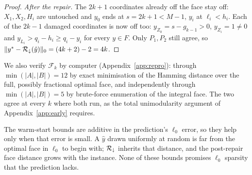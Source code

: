 \begin{proof}
\emph{After the repair.} The $2k+1$ coordinates already off the face stay off:
$X_1, X_2, H_i$ are untouched and $y_0$ ends at $s = 2k+1 < M-1$, $y_i$ at $\ell_i < h_i$. Each of
the $2k-1$ damaged coordinates is now off too: $y_{Z_0} = s - g_{k-1} > 0$, $y_{Z_i} = 1 \ne 0$ and
$y_{L_i} > q_i - h_i \ge q_i - y_i$ for every $y \in F$. Only $P_1, P_2$ still agree, so
$\|y^* - \mathcal{R}_\downarrow(\hat y)\|_0 = (4k+2) - 2 = 4k$.
\end{proof}

We also verify $\mathcal{F}_k$ by computer (Appendix~\ref{app:repro}): through
$\min(|A|,|B|) = 12$ by exact minimisation of the Hamming distance over the full, possibly
fractional optimal face, and independently through $\min(|A|,|B|) = 5$ by brute-force enumeration
of the integral face. The two agree at every $k$ where both run, as the total unimodularity
argument of Appendix~\ref{app:early} requires.

\begin{remark}
The warm-start bounds are additive in the prediction's $\ell_0$ error, so they help only when that
error is small. A $\hat{y}$ drawn uniformly at
random is far from the optimal face in $\ell_0$ to begin with; $\mathcal{R}_\downarrow$ inherits that
distance, and the post-repair face distance grows with the instance. None of these bounds promises
$\ell_0$ sparsity that the prediction lacks.
\end{remark}
